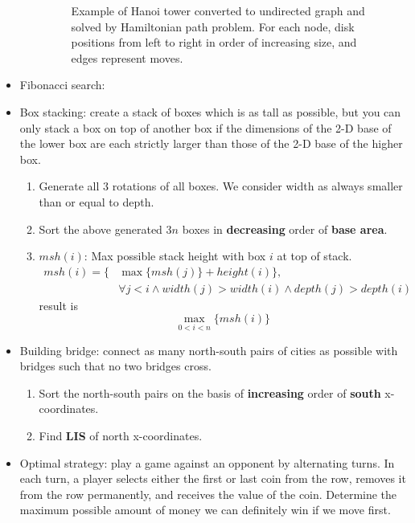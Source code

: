 \begin{itemize}
\begin{itemize}
\begin{figure}[H]
                \caption{Example of Hanoi tower converted to undirected graph and solved by Hamiltonian path problem. For each node, disk positions from left to right in order of increasing size, and edges represent moves.}
                \label{img:hanoi-tower-graph}
            \end{figure}
    \end{itemize}
    \item Fibonacci search: 
    \item Box stacking: create a stack of boxes which is as tall as possible, but you can only stack a box on top of another box if the dimensions of the 2-D base of the lower box are each strictly larger than those of the 2-D base of the higher box. \begin{enumerate}
        \item Generate all $3$ rotations of all boxes. We consider width as always smaller than or equal to depth.
        \item Sort the above generated $3n$ boxes in \textbf{decreasing} order of \textbf{base area}.
        \item $msh(i)$: Max possible stack height with box $i$ at top of stack. \begin{equation}
            \begin{aligned}
                msh(i) = \{& \max \{msh(j)\} + height(i)\}, \\ 
                & \forall j < i \land width(j) > width(i) \land depth(j) > depth(i)
            \end{aligned}
        \end{equation} result is \begin{equation}
            \max_{0 < i < n}\{msh(i)\}
        \end{equation}
    \end{enumerate}
    \item Building bridge: connect as many north-south pairs of cities as possible with bridges such that no two bridges cross. \begin{enumerate}
        \item Sort the north-south pairs on the basis of \textbf{increasing} order of \textbf{south} x-coordinates.
        \item Find \textbf{LIS} of north x-coordinates.
    \end{enumerate}
    \item Optimal strategy: play a game against an opponent by alternating turns. In each turn, a player selects either the first or last coin from the row, removes it from the row permanently, and receives the value of the coin. Determine the maximum possible amount of money we can definitely win if we move first. \\

\end{itemize}

